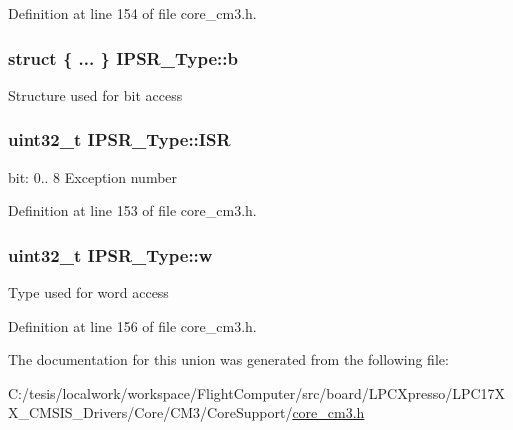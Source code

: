 \-Definition at line 154 of file core\-\_\-cm3.\-h.

\hypertarget{union_i_p_s_r___type_add0d6497bd50c25569ea22b48a03ec50}{
\subsubsection[{b}]{\setlength{\rightskip}{0pt plus 5cm}struct \{ ... \}   {\bf \-I\-P\-S\-R\-\_\-\-Type\-::b}}}\label{union_i_p_s_r___type_add0d6497bd50c25569ea22b48a03ec50}
\-Structure used for bit access \hypertarget{union_i_p_s_r___type_ab46e5f1b2f4d17cfb9aca4fffcbb2fa5}{
\subsubsection[{\-I\-S\-R}]{\setlength{\rightskip}{0pt plus 5cm}uint32\-\_\-t {\bf \-I\-P\-S\-R\-\_\-\-Type\-::\-I\-S\-R}}}\label{union_i_p_s_r___type_ab46e5f1b2f4d17cfb9aca4fffcbb2fa5}
bit\-: 0.. 8 \-Exception number 

\-Definition at line 153 of file core\-\_\-cm3.\-h.

\hypertarget{union_i_p_s_r___type_a4adca999d3a0bc1ae682d73ea7cfa879}{
\subsubsection[{w}]{\setlength{\rightskip}{0pt plus 5cm}uint32\-\_\-t {\bf \-I\-P\-S\-R\-\_\-\-Type\-::w}}}\label{union_i_p_s_r___type_a4adca999d3a0bc1ae682d73ea7cfa879}
\-Type used for word access 

\-Definition at line 156 of file core\-\_\-cm3.\-h.



\-The documentation for this union was generated from the following file\-:\begin{DoxyCompactItemize}
\item 
\-C\-:/tesis/localwork/workspace/\-Flight\-Computer/src/board/\-L\-P\-C\-Xpresso/\-L\-P\-C17\-X\-X\-\_\-\-C\-M\-S\-I\-S\-\_\-\-Drivers/\-Core/\-C\-M3/\-Core\-Support/\hyperlink{core__cm3_8h}{core\-\_\-cm3.\-h}\end{DoxyCompactItemize}
